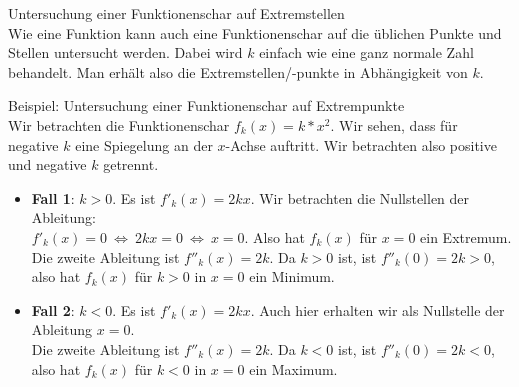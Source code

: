 \begin{bla}{Untersuchung einer Funktionenschar auf Extremstellen} \  \\
  Wie eine Funktion kann auch eine Funktionenschar auf die üblichen Punkte und Stellen untersucht werden. Dabei wird $k$ einfach wie eine ganz normale Zahl behandelt. Man erhält also die Extremstellen/-punkte in Abhängigkeit von $k$.
\end{bla}

\clearpage
\begin{bla}{Beispiel: Untersuchung einer Funktionenschar auf Extrempunkte} \  \\
  Wir betrachten die Funktionenschar $f_k(x)=k*x^2$. Wir sehen, dass für negative $k$ eine Spiegelung an der $x$-Achse auftritt. Wir betrachten also positive und negative $k$ getrennt.
  \begin{itemize}
    \item \textbf{Fall 1}: $k>0$. Es ist $f'_k(x)=2kx$. Wir betrachten die Nullstellen der Ableitung: \\
    $f'_k(x)=0\  \Leftrightarrow\  2kx=0\  \Leftrightarrow\  x=0$. Also hat $f_k(x)$ für $x=0$ ein Extremum. \\
    Die zweite Ableitung ist $f''_k(x)=2k$. Da $k>0$ ist, ist $f''_k(0)=2k>0$, also hat $f_k(x)$ für $k>0$ in $x=0$ ein Minimum.

    \item \textbf{Fall 2}: $k<0$. Es ist $f'_k(x)=2kx$. Auch hier erhalten wir als Nullstelle der Ableitung $x=0$. \\
    Die zweite Ableitung ist $f''_k(x)=2k$. Da $k<0$ ist, ist $f''_k(0)=2k<0$, also hat $f_k(x)$ für $k<0$ in $x=0$ ein Maximum.
  \end{itemize}

  \begin{marginfigure}[-25em]
\end{marginfigure}
\end{bla}
